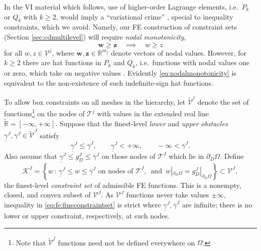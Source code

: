 \documentclass[letterpaper,final,12pt,reqno]{amsart}
\theoremstyle{cstyle}
\theoremstyle{cstyle*}
\theoremstyle{dstyle}
\numberwithin{equation}{section}
\numberwithin{figure}{section}
\numberwithin{table}{section}
\numberwithin{theorem}{section}
\newcommand{\RR}{\mathbb{R}}
\newcommand{\bw}{\mathbf{w}}
\newcommand{\bz}{\mathbf{z}}
\begin{document}
In the VI material which follows, use of higher-order Lagrange elements, i.e.~$P_k$ or $Q_k$ with $k\ge 2$, would imply a ``variational crime'' \cite[Chapter 10]{BrennerScott2007}, special to inequality constraints, which we avoid.  Namely, our FE construction of constraint sets (Section \ref{sec:cdmultilevel}) will require \emph{nodal monotonicity},
\begin{equation}
\bw \ge \bz \quad \implies \quad w \ge z \label{eq:nodalmonotonicity}
\end{equation}
for all $w,z \in \mathcal{V}^j$, where $\bw,\bz \in \RR^{m_j}$ denote vectors of nodal values.  However, for $k\ge 2$ there are hat functions in $P_k$ and $Q_k$, i.e.~functions with nodal values one or zero, which take on negative values \cite[Figure 1.7]{Elmanetal2014}.  Evidently \eqref{eq:nodalmonotonicity} is equivalent to the non-existence of such indefinite-sign hat functions.

To allow box constraints on all meshes in the hierarchy, let $\tilde{\mathcal{V}}^j$ denote the set of functions\footnote{Note that $\tilde{\mathcal{V}}^j$ functions need not be defined everywhere on $\Omega$.} on the nodes of $\mathcal{T}^j$ with values in the extended real line $\tilde{\RR} = [-\infty,+\infty]$.  Suppose that the finest-level \emph{lower} and \emph{upper obstacles} $\underline{\gamma}^J, \overline{\gamma}^J \in \tilde{\mathcal{V}}^J$ satisfy
\begin{equation}
\underline{\gamma}^J \le \overline{\gamma}^J, \qquad \underline{\gamma}^J < +\infty, \qquad -\infty < \overline{\gamma}^J. \label{eq:fe:boxconstraintrequirements}
\end{equation}
Also assume that $\underline{\gamma}^J \le g_D^J \le \overline{\gamma}^J$ on those nodes of $\mathcal{T}^J$ which lie in $\partial_D \Omega$.  Define
\begin{equation}
\mathcal{K}^J = \left\{w\,:\,\underline{\gamma}^J \le w \le \overline{\gamma}^J \text{ on nodes of } \mathcal{T}^J, \, \text{ and } \, w|_{\partial_D\Omega} = g_D^J|_{\partial_D\Omega}\right\} \subset \mathcal{V}^J, \label{eq:fe:fineconstraintset}
\end{equation}
the finest-level \emph{constraint set} of admissible FE functions.  This is a nonempty, closed, and convex subset of $\mathcal{V}^J$.  As $\mathcal{V}^J$ functions never take values $\pm\infty$, inequality in \eqref{eq:fe:fineconstraintset} is strict where $\underline{\gamma}^J, \overline{\gamma}^J$ are infinite; there is no lower or upper constraint, respectively, at such nodes.
\end{document}
